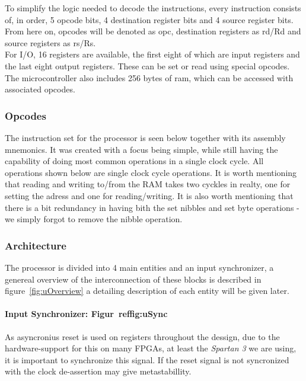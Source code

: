 To simplify the logic needed to decode the instructions, every instruction consists of, in order, 5 opcode bits,
4 destination register bits and 4 source register bits. From here on, opcodes will be denoted as opc, destination registers as
rd/Rd and source registers as rs/Rs. \\

For I/O, 16 registers are available, the first eight of which are input registers and the last eight output registers.
These can be set or read using special opcodes.\\

The microcontroller also includes 256 bytes of ram, which can be accessed with associated opcodes.

\subsubsection{Opcodes}
The instruction set for the processor is seen below together with its assembly mnemonics. It was created
with a focus being simple, while still having the capability of doing most common operations
in a single clock cycle. All operations shown below are single clock cycle
operations. It is worth mentioning that reading and writing to/from the RAM
takes two cyckles in realty, one for setting the adress and one for
reading/writing. It is also worth mentioning that there is a bit redundancy in
having bith the set nibbles and set byte operations - we simply forgot to remove
the nibble operation.
 

\subsubsection{Architecture}
The processor is divided into 4 main entities and an input synchronizer, a
genereal overview of the interconnection of these blocks is described in
figure~\ref{fig:uOverview} a detailing description of each entity will be given
later.
 
\paragraph{Input Synchronizer: Figur~ref{fig:uSync}}
As asyncronius reset is used on registers throughout the dessign, due to the
hardware-support for this on many FPGAs, at least the \emph{Spartan 3} we are
using, it is important to synchronize this signal. If the reset signal is not
syncronized with the clock de-assertion may give metastabillity.

